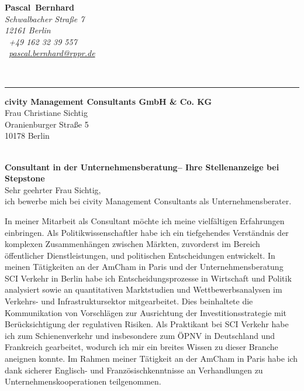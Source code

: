 \documentclass[11pt,a4paper]{article}
\def\firstname{Pascal}
\def\familyname{Bernhard}
\begin{document}
\sffamily   %
\hfill%
\begin{minipage}[t]{.6\textwidth}
	\raggedleft%
	{\bfseries {\color{firstnamecolor}\firstname}~{\color{familynamecolor}\familyname}}\\[.35ex]
	\small\itshape%
	Schwalbacher Straße 7\\
	12161 Berlin\\[.35ex]
	\Mobilefone~+49 162 32 39 557 \\
	\Letter~\href{mailto:pascal.bernhard@rppr.de}{pascal.bernhard@rppr.de}
\end{minipage}\\[0.5em]
%
{\color{firstnamecolor}\rule{\textwidth}{.25ex}}
%
\begin{minipage}[t]{.4\textwidth}
	\raggedright%
	\vspace*{1em}
	\textbf{civity Management Consultants GmbH \& Co. KG} \\
	Frau Christiane Sichtig \\[.35ex]
	\small%
	Oranienburger Straße 5\\
	10178 Berlin
\end{minipage}
%
\hfill
%
\begin{minipage}[t]{.4\textwidth}
	\raggedleft %
\end{minipage}\\[1em]


{\bfseries \color{familynamecolor}Consultant in der Unternehmensberatung-- Ihre Stellenanzeige bei Stepstone}\\[0.75em]

Sehr geehrter Frau Sichtig,\\[0.5em]
%
ich bewerbe mich bei civity Management Consultants als Unternehmensberater.

In meiner Mitarbeit als Consultant möchte ich meine vielfältigen Erfahrungen einbringen. Als Politikwissenschaftler habe ich ein tiefgehendes Verständnis der komplexen Zusammenhängen zwischen Märkten, zuvorderst im Bereich öffentlicher Dienstleistungen, und politischen Entscheidungen entwickelt. In meinen Tätigkeiten an der AmCham in Paris und der Unternehmensberatung SCI Verkehr in Berlin habe ich Entscheidungsprozesse in Wirtschaft und Politik analysiert sowie an quantitativen Marktstudien und Wettbewerbsanalysen im Verkehrs- und Infrastruktursektor mitgearbeitet. Dies beinhaltete die Kommunikation von Vorschlägen zur Ausrichtung der Investitionsstrategie mit Berücksichtigung der regulativen Risiken. Als Praktikant bei SCI Verkehr habe ich zum Schienenverkehr und insbesondere zum ÖPNV in Deutschland und Frankreich gearbeitet, wodurch ich mir ein breites Wissen zu dieser Branche aneignen konnte. Im Rahmen meiner Tätigkeit an der AmCham in Paris habe ich dank sicherer Englisch- und Französischkenntnisse an Verhandlungen zu Unternehmenskooperationen teilgenommen. 
\end{document}
